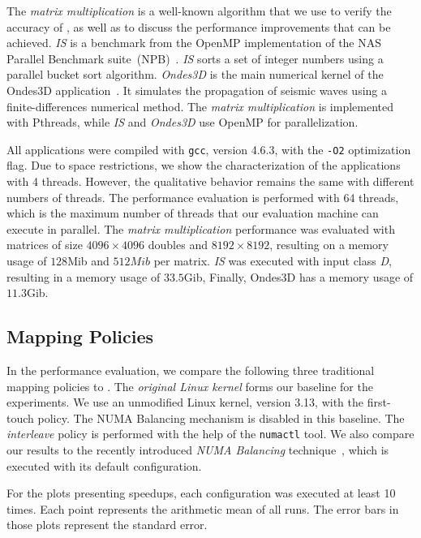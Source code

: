 The \emph{matrix multiplication} is a well-known algorithm that we use to verify the accuracy of \TABARNAC, as well as to discuss the performance improvements that can be achieved.
\emph{IS} is a benchmark from the OpenMP implementation of the NAS Parallel Benchmark suite~(NPB)~\cite{Jin1999}. \emph{IS} sorts a set of integer numbers using a parallel bucket sort algorithm.
\emph{Ondes3D} is the main numerical kernel of the Ondes3D application~\cite{Dupros2008}. It simulates the propagation of seismic waves using a finite-differences numerical method.
The \emph{matrix multiplication} is implemented with Pthreads, while \emph{IS} and \emph{Ondes3D} use OpenMP for parallelization.

All applications were compiled with \texttt{gcc}, version 4.6.3, with the \texttt{-O2} optimization flag.
Due to space restrictions, we show the characterization of the applications
with 4 threads. However, the qualitative behavior remains the same with different numbers of threads. The performance evaluation is performed with 64 threads,
which is the maximum number of threads that our evaluation machine can execute
in parallel. The \emph{matrix multiplication} performance was evaluated with
matrices of size $4096 \times 4096$ doubles and $8192 \times 8192$, resulting on
a memory usage of $128$Mib and $512Mib$ per matrix. \emph{IS} was executed
with input class \emph{D}, resulting in a memory usage of $33.5$Gib, Finally, Ondes3D has a memory usage of $11.3$Gib.

\subsection{Mapping Policies}

In the performance evaluation, we compare the following three traditional mapping policies to \TABARNAC.
The \emph{original Linux kernel} forms our baseline for the experiments. We use an unmodified Linux kernel, version 3.13, with the first-touch policy. The NUMA Balancing mechanism is disabled in this baseline.
The \emph{interleave} policy is performed with the help of the \texttt{numactl} tool.
We also compare our results to the recently introduced \emph{NUMA Balancing} technique~\cite{Corbet}, which is executed with its default configuration.

For the plots presenting speedups, each configuration was executed at least 10 times. Each point represents the arithmetic mean of all runs.
The error bars in those plots represent the standard error.


